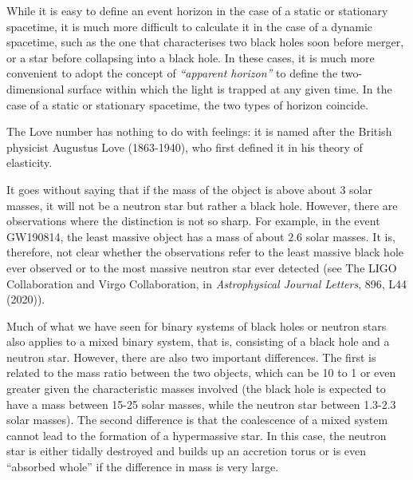 \begin{description}[style=multiline,leftmargin=2em,labelwidth=1.5em]
\item[5.]\hypertarget{note:08-05}{}While it is easy to define an event horizon in the case of a static or stationary
spacetime, it is much more difficult to calculate it in the case of a dynamic spacetime,
such as the one that characterises two black holes soon before merger, or a star before
collapsing into a black hole. In these cases, it is much more convenient to adopt the
concept of \emph{``apparent horizon''} to define the two-dimensional surface within
which the light is trapped at any given time. In the case of a static or stationary
spacetime, the two types of horizon coincide.

\item[6.]\hypertarget{note:08-06}{}The Love number has nothing to do with feelings: it is named after the British physicist
Augustus Love (1863-1940), who first defined it in his theory of
elasticity.

\item[7.]\hypertarget{note:08-07}{}It goes without saying that if the mass of the object is above about 3 solar masses, it
will not be a neutron star but rather a black hole. However, there are observations
where the distinction is not so sharp. For example, in the event
GW190814, the least massive object has a mass of about 2.6 solar
masses. It is, therefore, not clear whether the observations refer to the least massive
black hole ever observed or to the most massive neutron star ever detected (see The LIGO
Collaboration and Virgo Collaboration, in \emph{Astrophysical Journal Letters}, 896, L44
(2020)).

\item[8.]\hypertarget{note:08-08}{}Much of what we have seen for binary systems of black holes or neutron stars also
applies to a mixed binary system, that is, consisting of a black hole and a neutron
star. However, there are also two important differences. The first is related to the
mass ratio between the two objects, which can be 10 to 1 or even greater given the
characteristic masses involved (the black hole is expected to have a mass between 15-25
solar masses, while the neutron star between 1.3-2.3 solar masses). The second
difference is that the coalescence of a mixed system cannot lead to the formation of a
hypermassive star. In this case, the neutron star is either tidally destroyed and builds
up an accretion torus or is even ``absorbed whole'' if the difference in mass is very
large.


\end{description}
